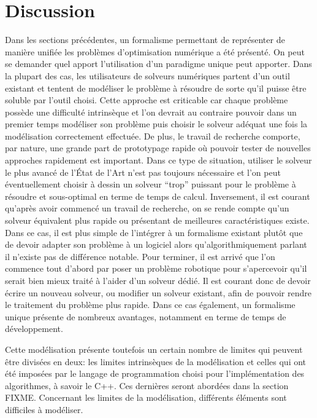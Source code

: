 \section{Discussion}


Dans les sections précédentes, un formalisme permettant de représenter
de manière unifiée les problèmes d'optimisation numérique a été
présenté. On peut se demander quel apport l'utilisation d'un paradigme
unique peut apporter. Dans la plupart des cas, les utilisateurs de
solveurs numériques partent d'un outil existant et tentent de
modéliser le problème à résoudre de sorte qu'il puisse être soluble
par l'outil choisi. Cette approche est criticable car chaque problème
possède une difficulté intrinsèque et l'on devrait au contraire
pouvoir dans un premier temps modéliser son problème puis choisir le
solveur adéquat une fois la modélisation correctement effectuée. De
plus, le travail de recherche comporte, par nature, une grande part de
prototypage rapide où pouvoir tester de nouvelles approches rapidement
est important. Dans ce type de situation, utiliser le solveur le plus
avancé de l'État de l'Art n'est pas toujours nécessaire et l'on peut
éventuellement choisir à dessin un solveur ``trop'' puissant pour le
problème à résoudre et sous-optimal en terme de temps de
calcul. Inversement, il est courant qu'après avoir commencé un travail
de recherche, on se rende compte qu'un solveur équivalent plus rapide
ou présentant de meilleures caractéristiques existe. Dans ce cas, il
est plus simple de l'intégrer à un formalisme existant plutôt que de
devoir adapter son problème à un logiciel alors qu'algorithmiquement
parlant il n'existe pas de différence notable. Pour terminer, il est
arrivé que l'on commence tout d'abord par poser un problème robotique
pour s'apercevoir qu'il serait bien mieux traité à l'aider d'un
solveur dédié. Il est courant donc de devoir écrire un nouveau
solveur, ou modifier un solveur existant, afin de pouvoir rendre le
traitement du problème plus rapide. Dans ce cas également, un
formalisme unique présente de nombreux avantages, notamment en terme
de temps de développement.


Cette modélisation présente toutefois un certain nombre de limites qui
peuvent être divisées en deux: les limites intrinsèques de la
modélisation et celles qui ont été imposées par le langage de
programmation choisi pour l'implémentation des algorithmes, à savoir
le C++. Ces dernières seront abordées dans la section
FIXME. Concernant les limites de la modélisation, différents éléments
sont difficiles à modéliser.


